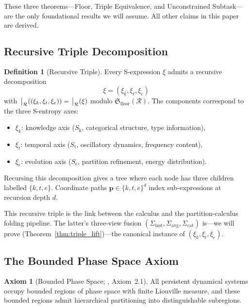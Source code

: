 \documentclass[11pt,twocolumn,a4paper]{article}
\theoremstyle{definition}
\newtheorem{definition}[theorem]{Definition}
\newtheorem{axiom}{Axiom}
\theoremstyle{remark}
\newcommand{\Sk}{S_{\mathrm{k}}}
\newcommand{\St}{S_{\mathrm{t}}}
\newcommand{\Se}{S_{\mathrm{e}}}
\newcommand{\Recv}{\mathcal{R}}
\newcommand{\Floor}{{\mathfrak{S}_{\mathrm{floor}}}}
\newcommand{\Sexp}{\xi}
\newcommand{\Sig}{\Sigma}
\begin{document}
These three theorems---Floor, Triple Equivalence, and Unconstrained Subtask---are the only foundational results we will assume. All other claims in this paper are derived.

\subsection{Recursive Triple Decomposition}

\begin{definition}[Recursive Triple]
\label{def:recursive_triple}
Every S-expression $\Sexp$ admits a recursive decomposition
\begin{equation}
\Sexp = (\Sexp_k, \Sexp_t, \Sexp_e)
\end{equation}
with $\eval_\Recv((\Sexp_k, \Sexp_t, \Sexp_e)) = \eval_\Recv(\Sexp)$ modulo $\Floor(\Recv)$. The components correspond to the three S-entropy axes:
\begin{itemize}[nosep]
    \item $\Sexp_k$: knowledge axis ($\Sk$, categorical structure, type information),
    \item $\Sexp_t$: temporal axis ($\St$, oscillatory dynamics, frequency content),
    \item $\Sexp_e$: evolution axis ($\Se$, partition refinement, energy distribution).
\end{itemize}
Recursing this decomposition gives a tree where each node has three children labelled $\{k, t, e\}$. Coordinate paths $\bm{p} \in \{k, t, e\}^d$ index sub-expressions at recursion depth $d$.
\end{definition}

This recursive triple is the link between the calculus and the partition-calculus folding pipeline. The latter's three-view fusion $(\Sig_{\mathrm{inst}}, \Sig_{\mathrm{avg}}, \Sig_{\mathrm{cat}})$ is---we will prove (Theorem~\ref{thm:triple_lift})---the canonical instance of $(\Sexp_k, \Sexp_t, \Sexp_e)$.

\subsection{The Bounded Phase Space Axiom}

\begin{axiom}[Bounded Phase Space; \citealt{sachikonye2025spec}, Axiom~2.1]
\label{ax:bounded}
All persistent dynamical systems occupy bounded regions of phase space with finite Liouville measure, and these bounded regions admit hierarchical partitioning into distinguishable subregions.
\end{axiom}
\end{document}
